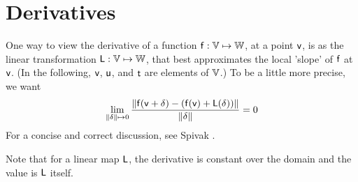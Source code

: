 
\section{Derivatives}
\label{sec:Derivatives}

One way to view the derivative of a function
$\mathsf{f}:\mathbb{V} \mapsto \mathbb{W}$,
at a point $\mathsf{v}$,
is as the linear transformation $\mathsf{L}:\mathbb{V} \mapsto \mathbb{W}$,
that best approximates the local 'slope' of $\mathsf{f}$ at $\mathsf{v}$.
(In the following, $\mathsf{v}$, $\mathsf{u}$, and $\mathsf{t}$ are elements of $\mathbb{V}$.)
To be a little more precise, we want
\begin{equation}
\lim_{ \|{\bf \delta}  \| \mapsto 0}
\frac{ \| \mathsf{f}(\mathsf{v} + {\bf \delta}) - (\mathsf{f}(\mathsf{v}) + \mathsf{L}({\bf\delta})) \|}
{\|{\bf \delta}  \| }
 = 0
\end{equation}
For a concise and correct discussion, see Spivak \cite{spivak-1965}.

Note that for a linear map $\mathsf{L}$,
the derivative is constant over the domain
and the value is $\mathsf{L}$ itself.

